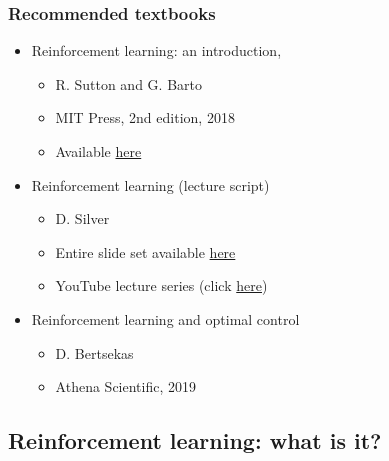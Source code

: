 \begin{frame}
\frametitle{Recommended textbooks}
\begin{itemize}
		\item Reinforcement learning: an introduction, 
		\begin{itemize}
			\item R. Sutton and G. Barto
			\item MIT Press, 2nd edition, 2018
			\item Available \href{http://www.incompleteideas.net/book/the-book.html}{here}
		\end{itemize}
		\vspace{0.5cm}
		\pause
		\item Reinforcement learning (lecture script)
		\begin{itemize}
		  \item D. Silver
			\item Entire slide set available \href{https://www.davidsilver.uk/teaching/}{here}
			\item YouTube lecture series (click \href{https://www.youtube.com/watch?v=2pWv7GOvuf0}{here})
		\end{itemize}
		\vspace{0.5cm}
		\pause
		\item Reinforcement learning and optimal control
		\begin{itemize}
			\item D. Bertsekas
			\item Athena Scientific, 2019
		\end{itemize}
	\end{itemize}
\end{frame}


\subsection{Reinforcement learning: what is it?} 


